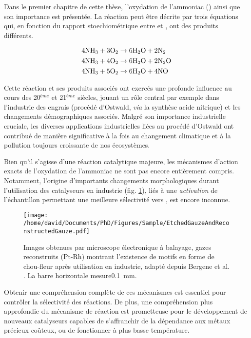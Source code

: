 Dans le premier chapitre de cette thèse, l'oxydation de l'ammoniac () ainsi que son importance est présentée.
La réaction peut être décrite par trois équations qui, en fonction du rapport stoechiométrique entre  et , ont des produits différents.

\begin{align}
    \label{eq:AmmoniaOxidationNitrogenFr}
    4 \ammonia + 3 \ce{O_2} & \rightarrow 6 \water + 2 \nitrogen \\
    \label{eq:AmmoniaOxidationNitrousOxideFr}
    4 \ammonia + 4 \ce{O_2} & \rightarrow 6 \water + 2 \nitrousoxide \\
    \label{eq:AmmoniaOxidationNitricOxideFr}
    4 \ammonia + 5 \ce{O_2} & \rightarrow 6 \water + 4 \nitricoxide
\end{align}

Cette réaction et ses produits associés ont exercés une profonde influence au cours des 20$^{ème}$ et 21$^{ème}$ siècles, jouant un rôle central par exemple dans l'industrie des engrais (procédé d'Ostwald, \textit{via} la synthèse acide nitrique) et les changements démographiques associés.
Malgré son importance industrielle cruciale, les diverses applications industrielles liées au procédé d'Ostwald ont contribué de manière significative à la fois au changement climatique et à la pollution toujours croissante de nos écosystèmes.

Bien qu’il s’agisse d’une réaction catalytique majeure, les mécanismes d’action exacts de l'oxydation de l'ammoniac ne sont pas encore entièrement compris.
Notamment, l'origine d'importants changements morphologiques durant l'utilisation des catalyseurs en industrie (fig. \ref{fig:GauzesFr}), liés à une \textit{activation} de l'échantillon permettant une meilleure sélectivité vers , est encore inconnue.

\begin{figure}[!htb]
    \centering
    \texttt{[image: /home/david/Documents/PhD/Figures/Sample/EtchedGauzeAndReconstructedGauze.pdf]}
    \caption{
    Images obtenues par microscope électronique à balayage, gazes reconstruits (Pt-Rh) montrant l'existence de motifs en forme de chou-fleur après utilisation en industrie, adapté depuis Bergene et al. \parencite*{Bergene1996}.
    La barre horizontale mesure\qty{0.1}{\mm}.
    }
    \label{fig:GauzesFr}
\end{figure}

Obtenir une compréhension complète de ces mécanismes est essentiel pour contrôler la sélectivité des réactions.
De plus, une compréhension plus approfondie du mécanisme de réaction est prometteuse pour le développement de nouveaux catalyseurs capables de s’affranchir de la dépendance aux métaux précieux coûteux, ou de fonctionner à plus basse température.


